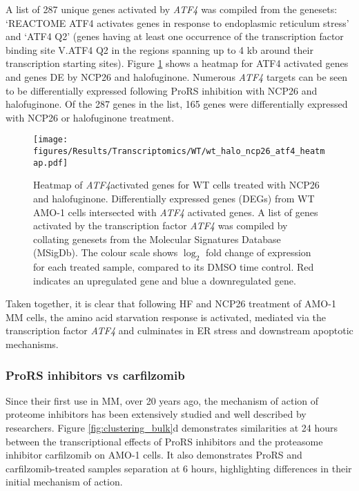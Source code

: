 A list of 287 unique genes activated by \textit{ATF4} was compiled from the genesets: `REACTOME ATF4 activates genes in response to endoplasmic reticulum stress' and `ATF4 Q2' (genes having at least one occurrence of the transcription factor binding site V.ATF4 Q2 in the regions spanning up to 4 kb around their transcription starting sites).
Figure \ref{fig:wt_atf4_heatmap} shows a heatmap for ATF4 activated genes and genes DE by NCP26 and halofuginone.
Numerous \textit{ATF4} targets can be seen to be differentially expressed following ProRS inhibition with NCP26 and halofuginone.
Of the 287 genes in the list, 165 genes were differentially expressed with NCP26 or halofuginone treatment.


\begin{figure}[p]
\centering
\texttt{[image: figures/Results/Transcriptomics/WT/wt\_halo\_ncp26\_atf4\_heatmap.pdf]}
\caption[Heatmap of \textit{ATF4} activated genes for ProRS treated WT cells]{Heatmap of \textit{ATF4}activated genes for WT cells treated with NCP26 and halofuginone.
Differentially expressed genes (DEGs) from WT AMO-1 cells intersected with \textit{ATF4} activated genes.
A list of genes activated by the transcription factor \textit{ATF4} was compiled by collating genesets from the Molecular Signatures Database (MSigDb).
The colour scale shows $\log_{2}$ fold change of expression for each treated sample, compared to its DMSO time control.
Red indicates an upregulated gene and blue a downregulated gene.
}
\label{fig:wt_atf4_heatmap}
\end{figure}

Taken together, it is clear that following HF and NCP26 treatment of AMO-1 MM cells, the amino acid starvation response is activated, mediated via the transcription factor \textit{ATF4} and culminates in ER stress and downstream apoptotic mechanisms.

\subsubsection{ProRS inhibitors vs carfilzomib}
Since their first use in MM, over 20 years ago, the mechanism of action of proteome inhibitors has been extensively studied and well described by researchers\cite{nunes2017proteasome}.
Figure \ref{fig:clustering_bulk}d demonstrates similarities at 24 hours between the transcriptional effects of ProRS inhibitors and the proteasome inhibitor carfilzomib on AMO-1 cells.
It also demonstrates ProRS and carfilzomib-treated samples separation at 6 hours, highlighting differences in their initial mechanism of action.

